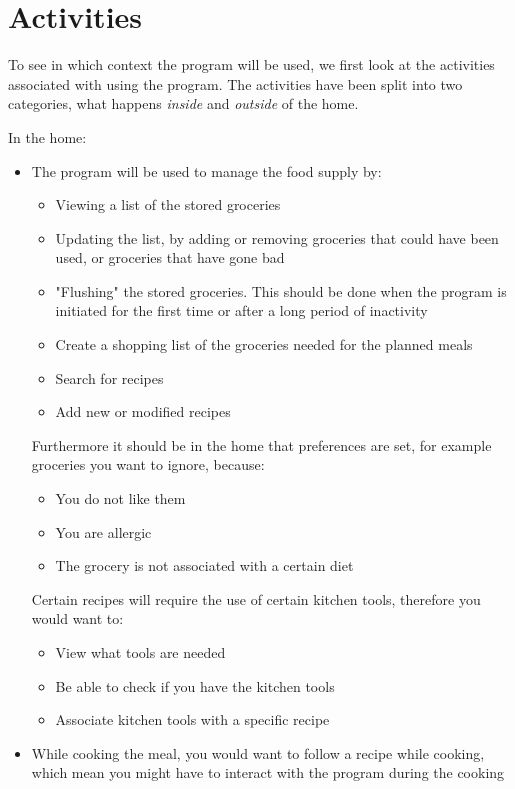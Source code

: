 \section{Activities}
To see in which context the program will be used, we first look at the activities associated with using the program. The activities have been split into two categories, what happens \textit{inside} and \textit{outside} of the home.

In the home:
\begin{itemize}
\item The program will be used to manage the food supply by:
	\begin{itemize}
		\item Viewing a list of the stored groceries
		\item Updating the list, by adding or removing groceries that could have been used, or groceries that have gone bad
		\item "Flushing" the stored groceries. This should be done when the program is initiated for the first time or after a long period of inactivity
		\item Create a shopping list of the groceries needed for the planned meals
		\item Search for recipes
		\item Add new or modified recipes
	\end{itemize}
	Furthermore it should be in the home that preferences are set, for example groceries you want to ignore, because:
	\begin{itemize}
		\item You do not like them
		\item You are allergic
		\item The grocery is not associated with a certain diet
	\end{itemize}
	Certain recipes will require the use of certain kitchen tools, therefore you would want to:
	\begin{itemize}
		\item View what tools are needed
		\item Be able to check if you have the kitchen tools
		\item Associate kitchen tools with a specific recipe
	\end{itemize}
	\item While cooking the meal, you would want to follow a recipe while cooking, which mean you might have to interact with the program during the cooking
\end{itemize}

